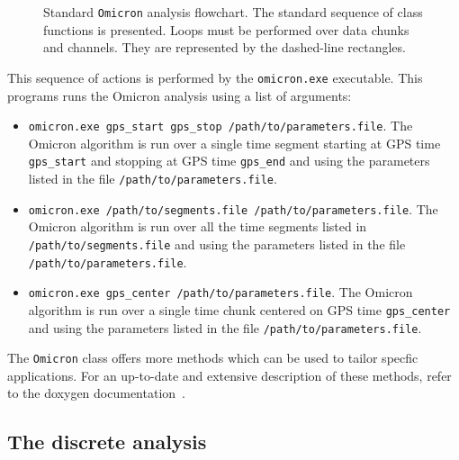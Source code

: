 \begin{figure}
  \center
  \caption{Standard \texttt{Omicron} analysis flowchart. The standard sequence of class functions is presented. Loops must be performed over data chunks and channels. They are represented by the dashed-line rectangles.}
  \label{fig:omicron_flowchart}
\end{figure}

This sequence of actions is performed by the \texttt{omicron.exe} executable. This programs runs the Omicron analysis using a list of arguments:
\begin{itemize}
  \item \texttt{omicron.exe gps\_start gps\_stop /path/to/parameters.file}. The Omicron algorithm is run over a single time segment starting at GPS time \texttt{gps\_start} and stopping at GPS time \texttt{gps\_end} and using the parameters listed in the file \texttt{/path/to/parameters.file}.
  \item \texttt{omicron.exe /path/to/segments.file /path/to/parameters.file}. The Omicron algorithm is run over all the time segments listed in \texttt{/path/to/segments.file} and using the parameters listed in the file \texttt{/path/to/parameters.file}.
  \item \texttt{omicron.exe gps\_center /path/to/parameters.file}. The Omicron algorithm is run over a single time chunk centered on GPS time \texttt{gps\_center} and using the parameters listed in the file \texttt{/path/to/parameters.file}.
\end{itemize}
The \texttt{Omicron} class offers more methods which can be used to tailor specfic applications. For an up-to-date and extensive description of these methods, refer to the doxygen documentation~\cite{Omicron_doxygen}.


\subsection{The discrete analysis} \label{sec:algorithm:discrete}

